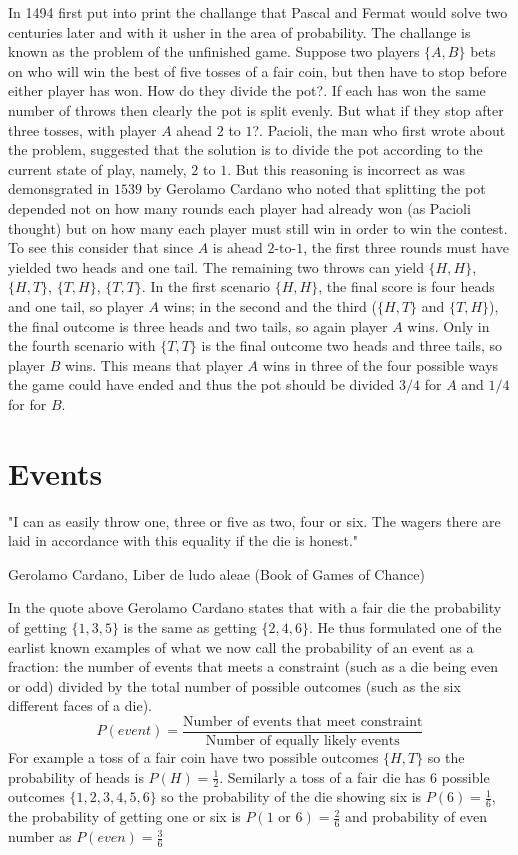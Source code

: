 \myindent In 1494  first put into print the challange that Pascal and Fermat would solve two centuries later and with it usher in the area of probability. The challange is known as the problem of the unfinished game. Suppose two players $\{A, B\}$ bets on who will win the best of five tosses of a fair coin, but then have to stop before either player has won. How do they divide the pot?. If each has won the same number of throws then clearly the pot is split evenly. But what if they stop after three tosses, with player $A$ ahead $2$ to $1$?. Pacioli, the man who first wrote about the problem, suggested that the solution is to divide the pot according to the current state of play, namely, $2$ to $1$. But this reasoning is incorrect as was demonsgrated in $1539$ by Gerolamo Cardano who noted that splitting the pot depended not on how many rounds each player had already won (as Pacioli thought) but on how many each player must still win in order to win the contest. To see this consider that since $A$ is ahead $2\text{-to-}1$, the first three rounds must have yielded two heads and one tail. The remaining two throws can yield $\{H,H\}$, $\{H,T\}$, $\{T,H\}$, $\{T,T\}$. In the first scenario $\{H,H\}$, the final score is four heads and one tail, so player $A$ wins; in the second and the third ($\{H,T\}$ and $\{T,H\}$), the final outcome is three heads and two tails, so again player $A$ wins. Only in the fourth scenario with $\{T,T\}$ is the final outcome two heads and three tails, so player $B$ wins. This means that player $A$ wins in three of the four possible ways the game could have ended and thus the pot should be divided $3/4$ for $A$ and $1/4$ for for $B$. 

\section{Events}
\epigraph{"I can as easily throw one, three or five as two, four or six. The wagers there are laid in accordance with this equality if the die is honest."}{\textup{Gerolamo Cardano}, Liber de ludo aleae (Book of Games of Chance)}

In the quote above Gerolamo Cardano states that with a fair die the probability of getting $\{1,3,5\}$ is the same as getting $\{2,4,6\}$. He thus formulated one of the earlist known examples of what we now call the probability of an event as a fraction: the number of events that meets a constraint (such as a die being even or odd) divided by the total number of possible outcomes (such as the six different faces of a die). 
\[
P(event) = \frac{\text{Number of events that meet constraint}}{\text{Number of equally likely events}}
\]
For example a toss of a fair coin have two possible outcomes $\{H,T\}$ so the probability of heads is $P(H) = \frac{1}{2}$. Semilarly a toss of a fair die has $6$ possible outcomes $\{1, 2, 3, 4, 5, 6\}$ so the probability of the die showing six is $P(6) = \frac{1}{6}$, the probability of getting one or six is $P(1 \text{ or } 6) = \frac{2}{6}$ and probability of even number as $P(even) = \frac{3}{6}$

